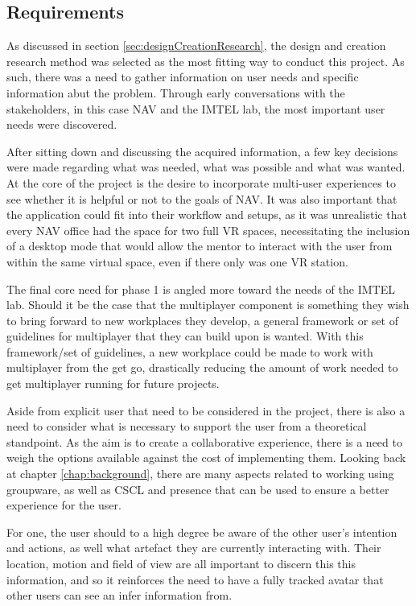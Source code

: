 \subsection{Requirements}

As discussed in section \ref{sec:designCreationResearch}, the design and creation research method was selected as the most fitting way to conduct this project. As such, there was a need to gather information on user needs and specific information abut the problem. Through early conversations with the stakeholders, in this case NAV and the IMTEL lab, the most important user needs were discovered. 

After sitting down and discussing the acquired information, a few key decisions were made regarding what was needed, what was possible and what was wanted.  At the core of the project is the desire to incorporate multi-user experiences to see whether it is helpful or not to the goals of NAV. It was also important that the application could fit into their workflow and setups, as it was unrealistic that every NAV office had the space for two full VR spaces, necessitating the inclusion of a desktop mode that would allow the mentor to interact with the user from within the same virtual space, even if there only was one VR station. 

The final core need for phase 1 is angled more toward the needs of the IMTEL lab. Should it be the case that the multiplayer component is something they wish to bring forward to new workplaces they develop, a general framework or set of guidelines for multiplayer that they can build upon is wanted. With this framework/set of guidelines, a new workplace could be made to work with multiplayer from the get go, drastically reducing the amount of work needed to get multiplayer running for future projects.

Aside from explicit user that need to be considered in the project, there is also a need to consider what is necessary to support the user from a theoretical standpoint. As the aim is to create a collaborative experience, there is a need to weigh the options available against the cost of implementing them. Looking back at chapter \ref{chap:background}, there are many aspects related to working using groupware, as well as CSCL and presence that can be used to ensure a better experience for the user.

For one, the user should to a high degree be aware of the other user's intention and actions, as well what artefact they are currently interacting with. Their location, motion and field of view are all important to discern this this information, and so it reinforces the need to have a fully tracked avatar that other users can see an infer information from.

